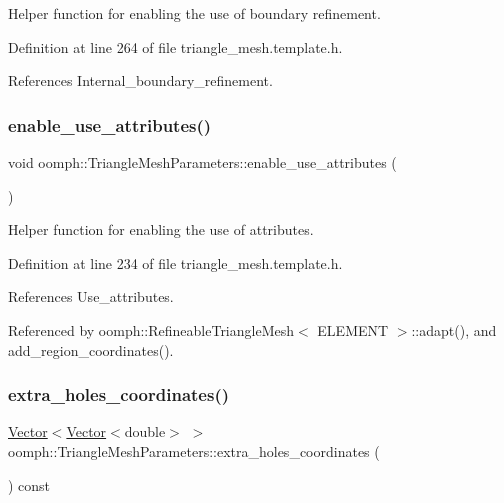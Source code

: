 Helper function for enabling the use of boundary refinement. 



Definition at line 264 of file triangle\+\_\+mesh.\+template.\+h.



References Internal\+\_\+boundary\+\_\+refinement.

\mbox{\label{classoomph_1_1TriangleMeshParameters_a53701f21655e8eebe547a090801c43ac}} 
\subsubsection{\texorpdfstring{enable\+\_\+use\+\_\+attributes()}{enable\_use\_attributes()}}
{\footnotesize\ttfamily void oomph\+::\+Triangle\+Mesh\+Parameters\+::enable\+\_\+use\+\_\+attributes (\begin{DoxyParamCaption}{ }\end{DoxyParamCaption})\hspace{0.3cm}{\ttfamily [inline]}}



Helper function for enabling the use of attributes. 



Definition at line 234 of file triangle\+\_\+mesh.\+template.\+h.



References Use\+\_\+attributes.



Referenced by oomph\+::\+Refineable\+Triangle\+Mesh$<$ E\+L\+E\+M\+E\+N\+T $>$\+::adapt(), and add\+\_\+region\+\_\+coordinates().

\mbox{\label{classoomph_1_1TriangleMeshParameters_a276f810c828931b720ce9dfc3d0af2af}} 
\subsubsection{\texorpdfstring{extra\+\_\+holes\+\_\+coordinates()}{extra\_holes\_coordinates()}\hspace{0.1cm}{\footnotesize\ttfamily [1/2]}}
{\footnotesize\ttfamily \hyperlink{classoomph_1_1Vector}{Vector}$<$\hyperlink{classoomph_1_1Vector}{Vector}$<$double$>$ $>$ oomph\+::\+Triangle\+Mesh\+Parameters\+::extra\+\_\+holes\+\_\+coordinates (\begin{DoxyParamCaption}{ }\end{DoxyParamCaption}) const\hspace{0.3cm}{\ttfamily [inline]}}



